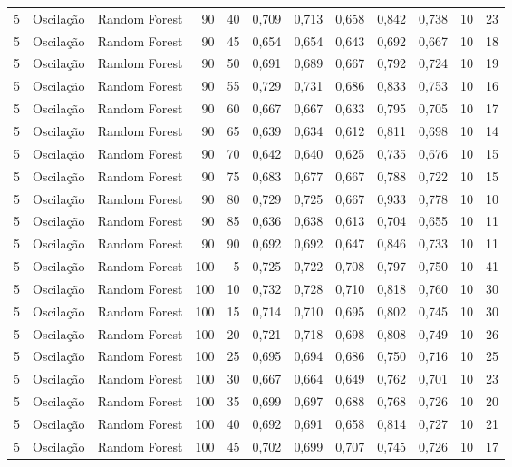 \begin{longtable}{@{}rllrrrrrrrrr@{}}
5 & Oscilação & Random Forest & 90 & 40 & 0,709 & 0,713 & 0,658 & 0,842 & 0,738 & 10 & 23 \\
5 & Oscilação & Random Forest & 90 & 45 & 0,654 & 0,654 & 0,643 & 0,692 & 0,667 & 10 & 18 \\
5 & Oscilação & Random Forest & 90 & 50 & 0,691 & 0,689 & 0,667 & 0,792 & 0,724 & 10 & 19 \\
5 & Oscilação & Random Forest & 90 & 55 & 0,729 & 0,731 & 0,686 & 0,833 & 0,753 & 10 & 16 \\
5 & Oscilação & Random Forest & 90 & 60 & 0,667 & 0,667 & 0,633 & 0,795 & 0,705 & 10 & 17 \\
5 & Oscilação & Random Forest & 90 & 65 & 0,639 & 0,634 & 0,612 & 0,811 & 0,698 & 10 & 14 \\
5 & Oscilação & Random Forest & 90 & 70 & 0,642 & 0,640 & 0,625 & 0,735 & 0,676 & 10 & 15 \\
5 & Oscilação & Random Forest & 90 & 75 & 0,683 & 0,677 & 0,667 & 0,788 & 0,722 & 10 & 15 \\
5 & Oscilação & Random Forest & 90 & 80 & 0,729 & 0,725 & 0,667 & 0,933 & 0,778 & 10 & 10 \\
5 & Oscilação & Random Forest & 90 & 85 & 0,636 & 0,638 & 0,613 & 0,704 & 0,655 & 10 & 11 \\
5 & Oscilação & Random Forest & 90 & 90 & 0,692 & 0,692 & 0,647 & 0,846 & 0,733 & 10 & 11 \\
5 & Oscilação & Random Forest & 100 & 5 & 0,725 & 0,722 & 0,708 & 0,797 & 0,750 & 10 & 41 \\
5 & Oscilação & Random Forest & 100 & 10 & 0,732 & 0,728 & 0,710 & 0,818 & 0,760 & 10 & 30 \\
5 & Oscilação & Random Forest & 100 & 15 & 0,714 & 0,710 & 0,695 & 0,802 & 0,745 & 10 & 30 \\
5 & Oscilação & Random Forest & 100 & 20 & 0,721 & 0,718 & 0,698 & 0,808 & 0,749 & 10 & 26 \\
5 & Oscilação & Random Forest & 100 & 25 & 0,695 & 0,694 & 0,686 & 0,750 & 0,716 & 10 & 25 \\
5 & Oscilação & Random Forest & 100 & 30 & 0,667 & 0,664 & 0,649 & 0,762 & 0,701 & 10 & 23 \\
5 & Oscilação & Random Forest & 100 & 35 & 0,699 & 0,697 & 0,688 & 0,768 & 0,726 & 10 & 20 \\
5 & Oscilação & Random Forest & 100 & 40 & 0,692 & 0,691 & 0,658 & 0,814 & 0,727 & 10 & 21 \\
5 & Oscilação & Random Forest & 100 & 45 & 0,702 & 0,699 & 0,707 & 0,745 & 0,726 & 10 & 17 \\

\end{longtable}
